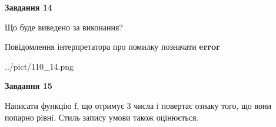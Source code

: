 \documentclass[11pt, ukrainian]{article}
\begin{document}
{\begin {large}
{\begin {center}\textbf{Завдання 14}\end {center}}\par
Що буде виведено за виконання? \par
Повідомлення інтерпретатора про помилку позначати \textbf{error}

\begin{center}
	{../pict/110_14.png}
\end{center}
\newpage

{\begin {center}\textbf{Завдання 15}\end {center}}\par

Написати функцiю f, що отримує 3 числа i повертає ознаку того, що вони попарно рiвнi. Стиль запису умови також оцінюється.\par
\newpage

\end {large}}
\end{document}
